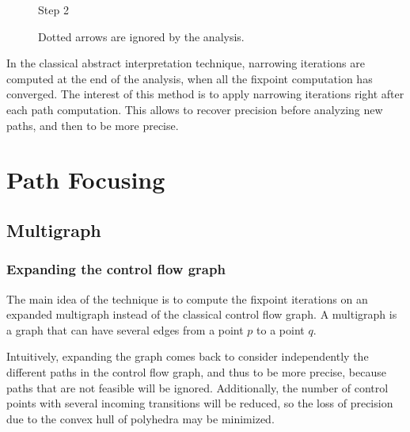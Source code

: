 \documentclass[a4paper,english,titlepage,11pt]{report}
\begin{document}
\begin{figure}[!h]
\begin{minipage}[c]{.46\linewidth}
\begin{tikzpicture}[->,>=stealth',auto,node distance=1.5cm,
                    semithick,font=\footnotesize]
\end{tikzpicture}
\centering Step 2
   \end{minipage}
   \caption{Dotted arrows are ignored by the analysis.}
\label{gopanreps}
\end{figure}
\FloatBarrier

In the classical abstract interpretation technique, narrowing iterations are
computed at the end of the analysis, when all the fixpoint computation has
converged.
The interest of this method is to apply narrowing iterations right after each
path computation. This allows to recover precision before analyzing new paths,
and then to be more precise. 

 \section{Path Focusing}

	\subsection{Multigraph}

	\subsubsection{Expanding the control flow graph}
	The main idea of the technique is to compute the fixpoint iterations on an
	expanded multigraph instead of the classical control flow graph. A
	multigraph is a graph that can have several edges from a point $p$ to a
	point $q$. 

	Intuitively, expanding the graph comes back to consider independently the
	different paths in the control flow graph, and thus to be more precise,
	because paths that are not feasible will be ignored. Additionally, the
	number of control points with several incoming transitions will be reduced,
	so the loss of precision due to the convex hull of polyhedra may be
	minimized.
\end{document}
